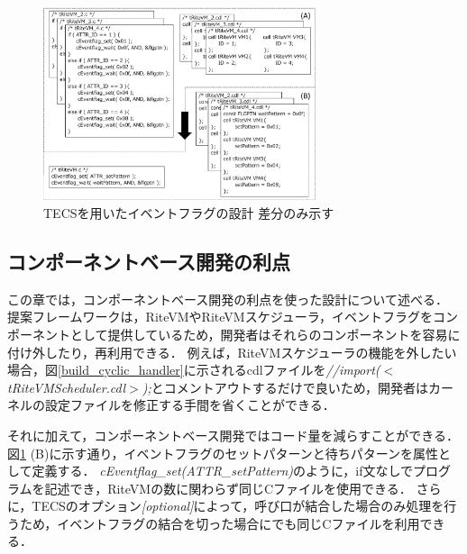 \documentclass[submit,techrep]{ipsj}
\begin{document}
\begin{figure}[t]
    \centering
    \includegraphics[width=8cm,clip]{../EMSOFT2016/figure/Eventflag.pdf}
    \vspace{-2mm}
    \caption{TECSを用いたイベントフラグの設計 {\scriptsize *差分のみ示す}}
\vspace{-3mm}
    \label{fig:Eventflag}
\end{figure}
\vspace{-5mm}
\subsection{コンポーネントベース開発の利点}
この章では，コンポーネントベース開発の利点を使った設計について述べる．
提案フレームワークは，RiteVMやRiteVMスケジューラ，イベントフラグをコンポーネントとして提供しているため，開発者はそれらのコンポーネントを容易に付け外したり，再利用できる．
例えば，RiteVMスケジューラの機能を外したい場合，図\ref{build_cyclic_handler}に示されるcdlファイルを{\it //import($<$tRiteVMScheduler.cdl$>$);}とコメントアウトするだけで良いため，開発者はカーネルの設定ファイルを修正する手間を省くことができる．

それに加えて，コンポーネントベース開発ではコード量を減らすことができる．
図\ref{fig:Eventflag} (B)に示す通り，イベントフラグのセットパターンと待ちパターンを属性として定義する．
{\it cEventflag\_set(ATTR\_setPattern)}のように，if文なしでプログラムを記述でき，RiteVMの数に関わらず同じCファイルを使用できる．
さらに，TECSのオプション{\it [optional]}によって，呼び口が結合した場合のみ処理を行うため，イベントフラグの結合を切った場合にでも同じCファイルを利用できる．

\vspace{-2mm}
\end{document}
